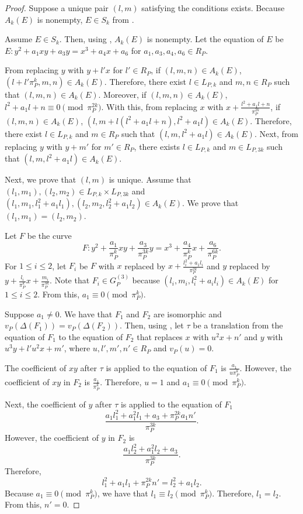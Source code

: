\documentclass[12pt,letterpaper]{amsart}
\theoremstyle{definition}
\begin{document}
\begin{proof}
Suppose a unique pair $(l,m)$ satisfying the conditions exists. Because $A_k(E)$ is nonempty, $E\in S_k$ from .

Assume $E\in S_k$. Then, using , $A_k(E)$ is nonempty. Let the equation of $E$ be $E:y^2+a_1xy+a_3y=x^3+a_4x+a_6$ for $a_1,a_3,a_4,a_6\in R_P$.

From replacing $y$ with $y+l'x$ for $l'\in R_P$, if $(l,m,n)\in A_k(E)$, $(l+l'\pi_P^{k}, m,n)\in A_k(E)$. Therefore, there exist $l\in L_{P,k}$ and $m,n\in R_P$ such that $(l,m,n)\in A_k(E)$. Moreover, if $(l,m,n)\in A_k(E)$, $l^2+a_1l+n\equiv 0\pmod{\pi_P^{2k}}$. With this, from replacing $x$ with $x+\frac{l^2+a_1l+n}{\pi_P^{2k}}$, if $(l,m,n)\in A_k(E)$, $(l,m+l(l^2+a_1l+n),l^2+a_1l)\in A_k(E)$. Therefore, there exist $l\in L_{P,k}$ and $m\in R_P$ such that $(l,m,l^2+a_1l)\in A_k(E)$. Next, from replacing $y$ with $y+m'$ for $m'\in R_P$, there exists $l\in L_{P,k}$ and $m\in L_{P,3k}$ such that $(l,m,l^2+a_1l)\in A_k(E)$.

Next, we prove that $(l,m)$ is unique. Assume that $(l_1,m_1), (l_2,m_2)\in L_{P,k}\times L_{P,3k}$ and $(l_1,m_1,l_1^2+a_1l_1), (l_2,m_2,l_2^2+a_1l_2) \in A_k(E)$. We prove that $(l_1,m_1)=(l_2,m_2)$.

Let $F$ be the curve 
\[
F:y^2+\frac{a_1}{\pi_P^k}xy+\frac{a_3}{\pi_P^{3k}}y=x^3+\frac{a_4}{\pi_P^k}x+\frac{a_6}{\pi_P^{6k}}.
\]
For $1\leq i\leq 2$, let $F_i$ be $F$ with $x$ replaced by $x+\frac{l_i^2+a_1l_i}{\pi_P^{2k}}$ and $y$ replaced by $y+\frac{l_i}{\pi_P^{k}}x+\frac{m_i}{\pi_P^{3k}}$. Note that $F_i\in G_P^{(3)}$ because $(l_i, m_i, l_i^2+a_il_i)\in A_k(E)$ for $1\leq i\leq 2$. From this, $a_1\equiv 0\pmod{\pi_P^k}$. 

Suppose $a_1\not=0$. We have that $F_1$ and $F_2$ are isomorphic and $v_P(\Delta(F_1))=v_P(\Delta(F_2))$. Then, using , let $\tau$ be a translation from the equation of $F_1$ to the equation of $F_2$ that replaces $x$ with $u^2x+n'$ and $y$ with $u^3y+l'u^2x+m'$, where $u,l',m',n'\in R_P$ and $v_P(u)=0$. 

The coefficient of $xy$ after $\tau$ is applied to the equation of $F_1$ is $\frac{a_1}{u\pi_P^k}$. However, the coefficient of $xy$ in $F_2$ is $\frac{a_1}{\pi_P^k}$. Therefore, $u=1$ and $a_1\equiv 0\pmod{\pi_P^k}$. 

Next, the coefficient of $y$ after $\tau$ is applied to the equation of $F_1$ \[
\frac{a_1l_1^2+a_1^2l_1+a_3+\pi_P^{2k}a_1n'}{\pi_P^{3k}}.
\]
However, the coefficient of $y$ in $F_2$ is
\[
\frac{a_1l_2^2+a_1^2l_2+a_3}{\pi_P^{3k}}.
\]
Therefore, 
\[
l_1^2+a_1l_1+\pi_P^{2k}n'=l_2^2+a_1l_2.
\]
Because $a_1\equiv 0\pmod{\pi_P^k}$, we have that $l_1\equiv l_2\pmod{\pi_P^k}$. Therefore, $l_1=l_2$. From this, $n'=0$.


\end{proof}
\end{document}
